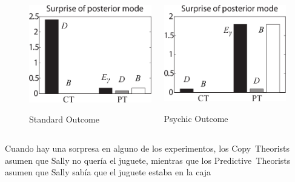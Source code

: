 \documentclass{beamer}
\begin{document}
\begin{frame}
\begin{figure}
\begin{columns}
\begin{column}{.5\textwidth}
\includegraphics[width=\textwidth]{imagenes/surprise_posterior_standard.png}
\vspace{-.3em}
\begin{center}
{\scriptsize Standard Outcome}
\end{center}
\end{column}
\begin{column}{.5\textwidth}
\includegraphics[width=\textwidth]{imagenes/surprise_posterior_psychic.png}
\vspace{-1em}
\begin{center}
{\scriptsize Psychic Outcome}
\end{center}
\end{column}
\end{columns}
\end{figure}

Cuando hay una sorpresa en alguno de los experimentos, los Copy~Theorists asumen que Sally no quería el juguete, mientras que los Predictive~Theorists asumen que Sally sabía que el juguete estaba en la caja

\end{frame}
\end{document}
